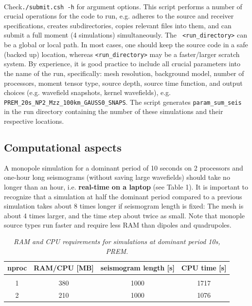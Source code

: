 \documentclass[11pt,letter,fleqn,english,notitlepage]{article}
\begin{document}
\\ 
Check{\tt ./submit.csh -h} for argument options.  This script performs a number
of crucial operations for the code to run, e.g. adheres to the source and
receiver specifications, creates subdirectories, copies relevant files into
them, and can submit a full moment (4 simulations) simultaneously.  The {\tt
<run\_directory>} can be a global or local path. In most cases, one should keep
the source code in a safe (backed up) location, whereas {\tt <run\_directory>}
may be a faster/larger scratch system.  By experience, it is good practice to
include all crucial parameters into the name of the run, specifically: mesh
resolution, background model, number of processors, moment tensor type, source
depth, source time function, and output choices (e.g. wavefield snapshots,
kernel wavefields), e.g.  {\tt PREM\_20s\_NP2\_Mzz\_100km\_GAUSS0\_SNAPS}.  The
script generates {\tt param\_sum\_seis} in the run directory containing the
number of these simulations and their respective locations. 

\subsection{Computational aspects}
\noindent A monopole simulation for a dominant period of 10 seconds on 2
processors and one-hour long seismograms (without saving large wavefields)
should take no longer than an hour, i.e. \textbf{real-time on a laptop} (see
Table 1).  It is important to recognize that a simulation at half the dominant
period compared to a previous simulation takes about 8 times longer if
seismogram length is fixed: The mesh is about 4 times larger, and the time step
about twice as small.  Note that monople source types run faster and require
less RAM than dipoles and quadrupoles.\\

\begin{table}[htb] 
    \begin{minipage}{150mm}
        \caption{ \textit{RAM and CPU requirements for simulations at dominant period 10s, PREM}.}
        \label{apptable:matrix_op}
        \vspace*{.2cm}
        \begin{tabular}{@{}cccc}
            nproc & RAM/CPU [MB] & seismogram length [s]& CPU time [s]\\
            \hline\\
            1 & 380 & 1000 & 1717\\
            2 & 210 & 1000 & 1076
        \end{tabular}
    \end{minipage}
\end{table}
\end{document}
